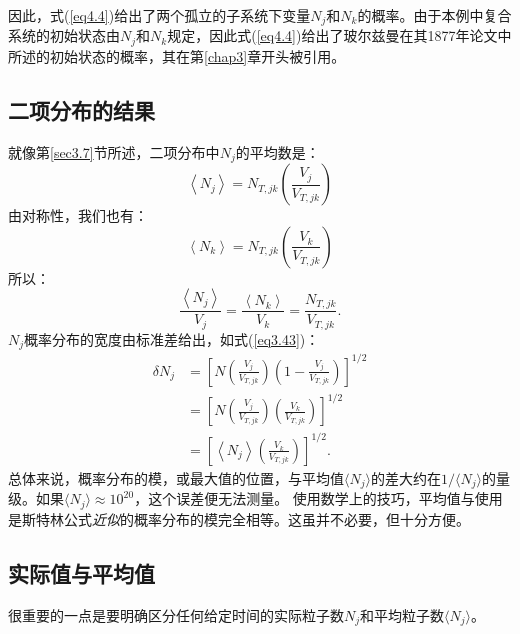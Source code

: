 \documentclass[UTF8]{ctexart}
\numberwithin{equation}{section}%
\numberwithin{figure}{section}%
\begin{document}
    因此，式(\ref{eq4.4})给出了两个孤立的子系统下变量$N_j$和$N_k$的概率。由于本例中复合系统的初始状态由$N_j$和$N_k$规定，因此式(\ref{eq4.4})给出了玻尔兹曼在其1877年论文中所述的初始状态的概率，其在第\ref{chap3}章开头被引用。

    \subsection{二项分布的结果}
    就像第\ref{sec3.7}节所述，二项分布中$N_j$的平均数是：
    \begin{equation}\label{eq4.6}
        \left\langle N_{j}\right\rangle=N_{T, j k}\left(\frac{V_{j}}{V_{T, j k}}\right)
    \end{equation}
    由对称性，我们也有：
    \begin{equation}
        \left\langle N_{k}\right\rangle=N_{T, j k}\left(\frac{V_{k}}{V_{T, j k}}\right)
    \end{equation}
    所以：
    \begin{equation}
        \frac{\left\langle N_{j}\right\rangle}{V_{j}}=\frac{\left\langle N_{k}\right\rangle}{V_{k}}=\frac{N_{T, j k}}{V_{T, j k}} .
    \end{equation}
    $N_j$概率分布的宽度由标准差给出，如式(\ref{eq3.43})：
    \begin{equation}\label{eq4.9}
        \begin{aligned}
            \delta N_{j} &=\left[N\left(\frac{V_{j}}{V_{T, j k}}\right)\left(1-\frac{V_{j}}{V_{T, j k}}\right)\right]^{1 / 2} \\
            &=\left[N\left(\frac{V_{j}}{V_{T, j k}}\right)\left(\frac{V_{k}}{V_{T, j k}}\right)\right]^{1 / 2} \\
            &=\left[\left\langle N_{j}\right\rangle\left(\frac{V_{k}}{V_{T, j k}}\right)\right]^{1 / 2} .
        \end{aligned}
    \end{equation}
    总体来说，概率分布的模，或最大值的位置，与平均值$\langle{N_j}\rangle$的差大约在$1/\langle{N_j}\rangle$的量级。如果$\langle{N_j}\rangle\approx 10^{20}$，这个误差便无法测量。
    使用数学上的技巧，平均值与使用是斯特林公式\textit{近似}的概率分布的模完全相等。这虽并不必要，但十分方便。
    \subsection{实际值与平均值}\label{sec4.5}
    很重要的一点是要明确区分任何给定时间的实际粒子数$N_j$和平均粒子数$\langle{N_j}\rangle$。
\end{document}
